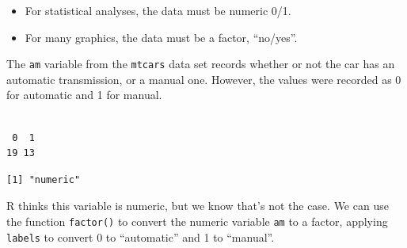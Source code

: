\documentclass[
  letterpaper,
  DIV=11,
  numbers=noendperiod,
  oneside]{scrreprt}
\newenvironment{Shaded}{\begin{snugshade}}{\end{snugshade}}
\newcommand{\CommentTok}[1]{\textcolor[rgb]{0.37,0.37,0.37}{#1}}
\newcommand{\FunctionTok}[1]{\textcolor[rgb]{0.28,0.35,0.67}{#1}}
\newcommand{\NormalTok}[1]{\textcolor[rgb]{0.00,0.23,0.31}{#1}}
\newcommand{\SpecialCharTok}[1]{\textcolor[rgb]{0.37,0.37,0.37}{#1}}
\providecommand{\tightlist}{%
  \setlength{\itemsep}{0pt}\setlength{\parskip}{0pt}}\usepackage{longtable,booktabs,array}
\begin{document}
\begin{itemize}
\tightlist
\item
  For statistical analyses, the data must be numeric 0/1.
\item
  For many graphics, the data must be a factor, ``no/yes''.
\end{itemize}

\begin{tcolorbox}[enhanced jigsaw, bottomrule=.15mm, colback=white, colframe=quarto-callout-tip-color-frame, toprule=.15mm, coltitle=black, rightrule=.15mm, opacitybacktitle=0.6, colbacktitle=quarto-callout-tip-color!10!white, toptitle=1mm, leftrule=.75mm, breakable, bottomtitle=1mm, titlerule=0mm, title={Example: What type of transmission does that car have?}, arc=.35mm, left=2mm, opacityback=0]

The \texttt{am} variable from the \texttt{mtcars} data set records
whether or not the car has an automatic transmission, or a manual one.
However, the values were recorded as 0 for automatic and 1 for manual.

\end{tcolorbox}

\begin{Shaded}
\end{Shaded}

\begin{verbatim}

 0  1 
19 13 
\end{verbatim}

\begin{Shaded}
\end{Shaded}

\begin{verbatim}
[1] "numeric"
\end{verbatim}

R thinks this variable is numeric, but we know that's not the case. We
can use the function \texttt{factor()} to convert the numeric variable
\texttt{am} to a factor, applying \texttt{labels} to convert 0 to
``automatic'' and 1 to ``manual''.
\end{document}
